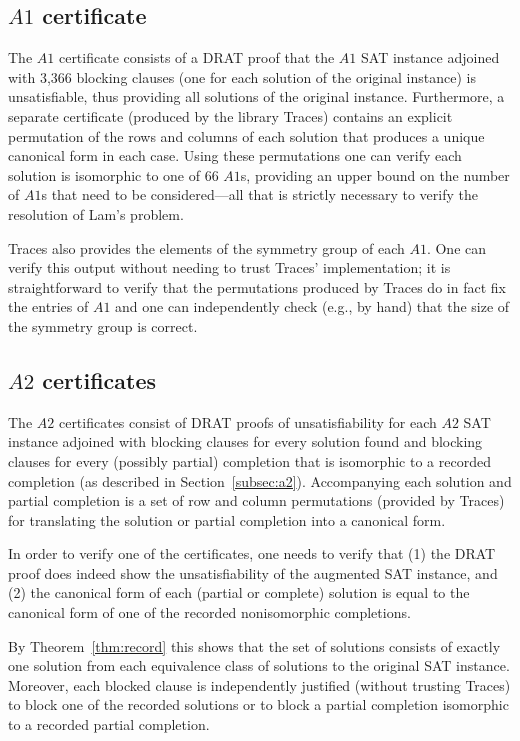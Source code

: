 \documentclass[letterpaper]{article}
\begin{document}
\subsection{\boldmath$A1$ certificate}\label{subsec:a1certificate}

The $A1$ certificate consists of a DRAT proof that the $A1$ SAT instance adjoined with
3,366 blocking clauses (one for each solution of the original
instance) is unsatisfiable, thus providing all solutions of the
original instance.  Furthermore, a separate certificate (produced by the library Traces)
contains an explicit permutation of the
rows and columns of each solution that produces
a unique canonical form in each case.
Using these permutations one can verify
each solution is isomorphic to one of 66 $A1$s, providing an upper bound on the
number of $A1$s that need to be considered---all that is strictly necessary
to verify the resolution of Lam's problem.

Traces also provides the elements of the symmetry group of each $A1$.
One can verify this output without needing to trust Traces' implementation;
it is straightforward to verify that the permutations
produced by Traces do in fact fix the entries of $A1$ and one can independently
check (e.g., by hand) that the size of the symmetry group is correct.

\subsection{\boldmath$A2$ certificates}\label{subsec:a2certificate}

The $A2$ certificates consist of DRAT proofs of unsatisfiability for
each $A2$ SAT instance adjoined with blocking clauses
for every solution found and blocking clauses for every
(possibly partial) completion that is isomorphic to
a recorded completion (as described in Section~\ref{subsec:a2}).
Accompanying each solution and
partial completion is a set of row and column permutations (provided
by Traces) for
translating the solution or partial completion into a canonical form.

In order to verify one of the certificates, one needs to verify that
(1) the DRAT proof does indeed show the unsatisfiability of the
augmented SAT instance, and (2) the canonical form of each
(partial or complete) solution is
equal to the canonical form of one of the recorded nonisomorphic completions.

By Theorem~\ref{thm:record} this shows that the set of solutions
consists of exactly one solution from each equivalence class of
solutions to the original SAT instance.  Moreover, each blocked
clause is independently justified
(without trusting Traces)
to block one of the recorded solutions or to block
a partial completion isomorphic to a recorded partial completion.
\end{document}
